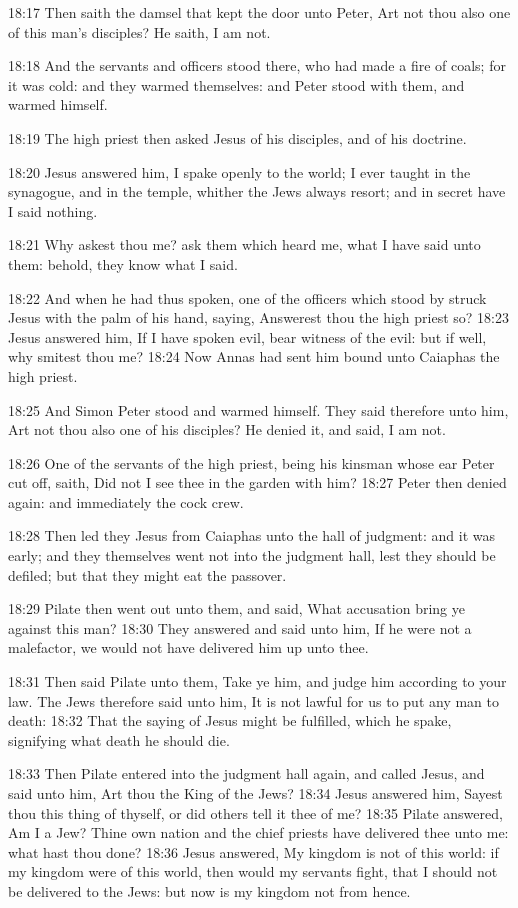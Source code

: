 18:17 Then saith the damsel that kept the door unto Peter, Art not
thou also one of this man's disciples? He saith, I am not.

18:18 And the servants and officers stood there, who had made a fire
of coals; for it was cold: and they warmed themselves: and Peter stood
with them, and warmed himself.

18:19 The high priest then asked Jesus of his disciples, and of his
doctrine.

18:20 Jesus answered him, I spake openly to the world; I ever taught
in the synagogue, and in the temple, whither the Jews always resort;
and in secret have I said nothing.

18:21 Why askest thou me? ask them which heard me, what I have said
unto them: behold, they know what I said.

18:22 And when he had thus spoken, one of the officers which stood by
struck Jesus with the palm of his hand, saying, Answerest thou the
high priest so?  18:23 Jesus answered him, If I have spoken evil, bear
witness of the evil: but if well, why smitest thou me?  18:24 Now
Annas had sent him bound unto Caiaphas the high priest.

18:25 And Simon Peter stood and warmed himself. They said therefore
unto him, Art not thou also one of his disciples? He denied it, and
said, I am not.

18:26 One of the servants of the high priest, being his kinsman whose
ear Peter cut off, saith, Did not I see thee in the garden with him?
18:27 Peter then denied again: and immediately the cock crew.

18:28 Then led they Jesus from Caiaphas unto the hall of judgment: and
it was early; and they themselves went not into the judgment hall,
lest they should be defiled; but that they might eat the passover.

18:29 Pilate then went out unto them, and said, What accusation bring
ye against this man?  18:30 They answered and said unto him, If he
were not a malefactor, we would not have delivered him up unto thee.

18:31 Then said Pilate unto them, Take ye him, and judge him according
to your law. The Jews therefore said unto him, It is not lawful for us
to put any man to death: 18:32 That the saying of Jesus might be
fulfilled, which he spake, signifying what death he should die.

18:33 Then Pilate entered into the judgment hall again, and called
Jesus, and said unto him, Art thou the King of the Jews?  18:34 Jesus
answered him, Sayest thou this thing of thyself, or did others tell it
thee of me?  18:35 Pilate answered, Am I a Jew? Thine own nation and
the chief priests have delivered thee unto me: what hast thou done?
18:36 Jesus answered, My kingdom is not of this world: if my kingdom
were of this world, then would my servants fight, that I should not be
delivered to the Jews: but now is my kingdom not from hence.

